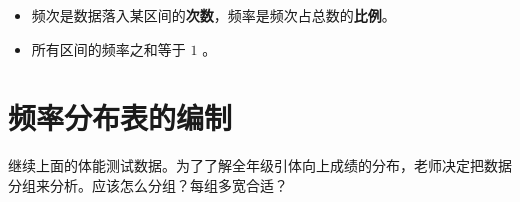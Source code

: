 \begin{keytakeaway}


\begin{itemize}
  \item 频次是数据落入某区间的\textbf{次数}，频率是频次占总数的\textbf{比例}。
  \item 所有区间的频率之和等于 $1$ 。
\end{itemize}


\end{keytakeaway}



\section*{频率分布表的编制}


\begin{explore}


继续上面的体能测试数据。为了了解全年级引体向上成绩的分布，老师决定把数据分组来分析。应该怎么分组？每组多宽合适？

\end{explore}

